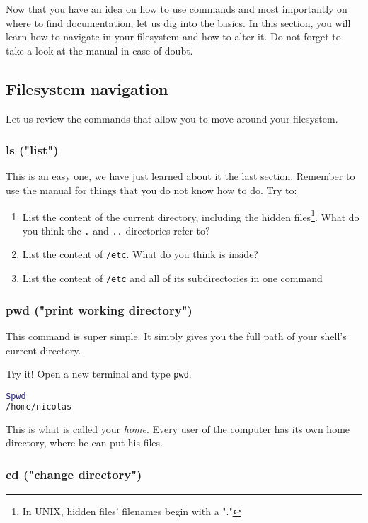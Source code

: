\documentclass[12pt]{article}
\begin{document}
Now that you have an idea on how to use commands and most importantly on where to find documentation, let us dig into the basics.
In this section, you will learn how to navigate in your filesystem and how to alter it.
Do not forget to take a look at the manual in case of doubt.

\subsection{Filesystem navigation}

Let us review the commands that allow you to move around your filesystem.

\subsubsection{ls ("list")}

This is an easy one, we have just learned about it the last section. Remember to use the manual for things that you do not know how to do.
Try to:
\begin{enumerate}
\item List the content of the current directory, including the hidden files\footnote{In UNIX, hidden files' filenames begin with a "."}. What do you think the \texttt{.} and \texttt{..} directories refer to?
\item List the content of \texttt{/etc}. What do you think is inside?
\item List the content of \texttt{/etc} and all of its subdirectories in one command
\end{enumerate}

\subsubsection{pwd ("print working directory")}

This command is super simple. It simply gives you the full path of your shell's current directory.

Try it! Open a new terminal and type \texttt{pwd}.
\begin{lstlisting}[language=bash]
$pwd
/home/nicolas
\end{lstlisting}
This is what is called your \textit{home}. Every user of the computer has its own home directory, where he can put his files.

\subsubsection{cd ("change directory")}
\end{document}
